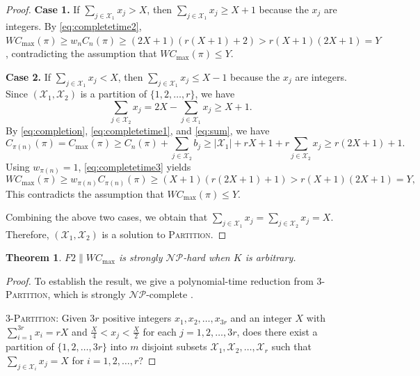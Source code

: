 ﻿\documentclass[12pt]{article}
\newtheorem{theorem}{Theorem}[section]
\begin{document}
\begin{sloppypar}
\begin{proof}
            \textbf{Case 1.} If $\sum_{j \in \mathcal{X}_1} x_j > X$, then $\sum_{j \in \mathcal{X}_1} x_j \geq X+1$ because the $x_j$ are integers. By \cref{eq:completetime2}, $W C_{\max}(\pi) \geq w_n C_n(\pi) \geq (2X+1) (r(X+1)+2) >r(X+1)(2X+1)=Y$, contradicting the assumption that $W C_{\max}(\pi) \leq Y$.  
            
            \textbf{Case 2.} If $\sum_{j \in \mathcal{X}_1} x_j < X$, then $\sum_{j \in \mathcal{X}_1} x_j \leq X-1$ because the $x_j$ are integers. Since $(\mathcal{X}_1, \mathcal{X}_2)$ is a partition of $\{1, 2, \ldots, r\}$, we have 
            \begin{equation} \label{eq:sum}
                \sum_{j \in \mathcal{X}_2} x_j =2X-\sum_{j \in \mathcal{X}_1} x_j \geq X+1.
            \end{equation} 
            By \cref{eq:completion}, \cref{eq:completetime1}, and \cref{eq:sum}, we have 
            \begin{equation}\label{eq:completetime3}
                C_{\pi(n)}(\pi)=C_{\max}(\pi) \geq C_n(\pi)+\sum_{j \in \mathcal{X}_2} b_j \geq |\mathcal{X}_1| +r X + 1+ r \sum_{j \in \mathcal{X}_2} x_j \geq r (2X + 1)+1.
            \end{equation}
            Using $w_{\pi(n)}=1$, \cref{eq:completetime3} yields
            \begin{equation*}
                W C_{\max}(\pi) \geq w_{\pi(n)} C_{\pi(n)}(\pi) \geq (X+1) (r(2X+1)+1) >r(X+1)(2X+1)=Y,
            \end{equation*} 
            This contradicts the assumption that $W C_{\max}(\pi) \leq Y$. 
            
            Combining the above two cases, we obtain that $\sum_{j \in \mathcal{X}_1} x_j = \sum_{j \in \mathcal{X}_2} x_j= X$. Therefore, $(\mathcal{X}_1, \mathcal{X}_2)$ is a solution to \textsc{Partition}.       
        \end{proof}
        
        \begin{theorem}\label{thm:snphard}
            $F2 \parallel WC_{\max}$ is strongly $\mathcal{NP}$-hard when $K$ is arbitrary.
        \end{theorem}
        \begin{proof}
            To establish the result, we give a polynomial-time reduction from 3-\textsc{Partition}, which is strongly  $\mathcal{NP}$-complete \citep{garey1979computers}.
            
            3-\textsc{Partition}: Given $3r$ positive integers $x_1, x_2, \ldots, x_{3r}$ and an integer $X$ with
            $\sum_{i=1}^{3r}x_i=rX$ and $\frac{X}{4} < x_j < \frac{X}{2}$ for each $j=1, 2, \ldots, 3r$, does there exist a partition of $\{1, 2, \ldots, 3r\}$ into $m$ disjoint subsets $\mathcal{X}_1, \mathcal{X}_2, \ldots, \mathcal{X}_r$ such that $\sum_{j \in \mathcal{X}_i} x_j=X$ for $i=1, 2, \ldots, r$?
            

\end{proof}
\end{sloppypar}
\end{document}
